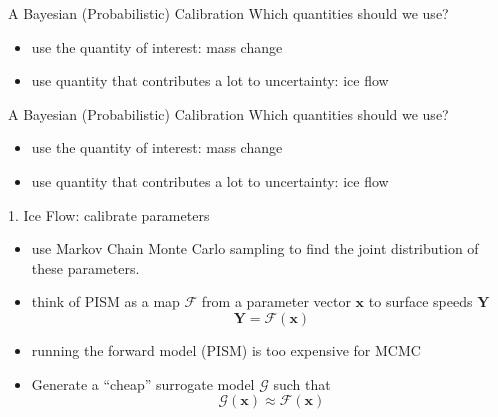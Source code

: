 \documentclass[hide notes,intlimits]{beamer}
\begin{document}
\begin{frame}{A Bayesian (Probabilistic) Calibration}
Which quantities should we use?
\begin{itemize}
\item use the quantity of interest: mass change
\item use quantity that contributes a lot to uncertainty: ice flow
\end{itemize}
\note[item]{}
\end{frame}


\begin{frame}{A Bayesian (Probabilistic) Calibration}
Which quantities should we use?
\begin{itemize}
\item use the quantity of interest: mass change
\item use quantity that contributes a lot to uncertainty: ice flow
\end{itemize}
\note[item]{}
\end{frame}

\begin{frame}{1. Ice Flow: calibrate parameters}
\begin{itemize}
\item use Markov Chain Monte Carlo sampling to find the joint distribution of these parameters.
\item think of PISM as a map $\mathcal{F}$ from a parameter vector $\mathbf{x}$ to surface speeds $\mathbf{Y}$
\begin{equation}
\mathbf{Y} = \mathcal{F}(\mathbf{x})
\end{equation}
\item running the forward model (PISM) is too expensive for MCMC
\item Generate a ``cheap'' surrogate model $\mathcal{G}$ such that
\begin{equation}
\mathcal{G}(\mathbf{x}) \approx \mathcal{F}(\mathbf{x})
\end{equation}
\end{itemize}

\end{frame}
\end{document}
